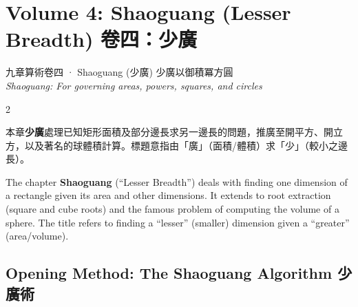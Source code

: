 \documentclass[10pt,a4paper]{article}
\begin{document}
\section{Volume 4: Shaoguang (Lesser Breadth) 卷四：少廣}

\begin{volumeheader}{{九章算術卷四} · Shaoguang (少廣)}
少廣以御積冪方圓\\[0.2em]
\small\textit{Shaoguang: For governing areas, powers, squares, and circles}
\end{volumeheader}

\vspace{0.3cm}

\begin{paracol}{2}
\begin{leftcolumn*}
本章\textbf{少廣}處理已知矩形面積及部分邊長求另一邊長的問題，推廣至開平方、開立方，以及著名的球體積計算。標題意指由「廣」（面積/體積）求「少」（較小之邊長）。
\end{leftcolumn*}
\begin{rightcolumn*}
The chapter \textbf{Shaoguang} (``Lesser Breadth'') deals with finding one dimension of a rectangle given its area and other dimensions. It extends to root extraction (square and cube roots) and the famous problem of computing the volume of a sphere. The title refers to finding a ``lesser'' (smaller) dimension given a ``greater'' (area/volume).
\end{rightcolumn*}
\end{paracol}

\subsection{Opening Method: The Shaoguang Algorithm 少廣術}
\end{document}
